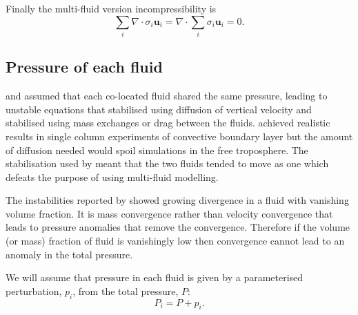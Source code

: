 \documentclass[draft]{agujournal2019}
\begin{document}
Finally the multi-fluid version incompressibility is
\begin{equation}
\sum_{i}\nabla\cdot\sigma_{i}\mathbf{u}_{i}  = \nabla\cdot\sum_{i}\sigma_{i}\mathbf{u}_{i}=0.
\label{eq:divFree}
\end{equation}

\subsection{Pressure of each fluid \label{subsec:fluidPressure}}

 and  assumed that each co-located fluid
shared the same pressure, leading to unstable equations that 
stabilised using diffusion of vertical velocity and 
stabilised using mass exchanges or drag between the fluids. 
achieved realistic results in single column experiments of convective
boundary layer but the amount of diffusion needed would spoil simulations
in the free troposphere. The stabilisation used by  meant
that the two fluids tended to move as one which defeats the purpose
of using multi-fluid modelling. 

The instabilities reported by  showed growing divergence
in a fluid with vanishing volume fraction. It is mass convergence
rather than velocity convergence that leads to pressure anomalies
that remove the convergence. Therefore if the volume (or mass) fraction
of fluid is vanishingly low then convergence cannot lead to an anomaly
in the total pressure.

We will assume that pressure in each fluid is given by a parameterised
perturbation, $p_{i}$, from the total pressure, $P$:
\begin{equation}
P_{i}=P+p_{i}.
\end{equation}
\end{document}
